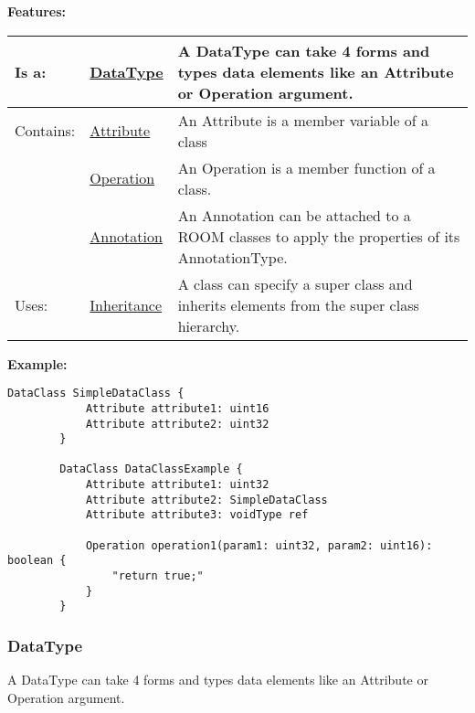 		
	\begingroup
	\textbf{Features:}
	\renewcommand{\arraystretch}{1.8} %
	\begin{longtable}{l|l p{}}
		\hline
	Is a: & \tabitem \hyperlink{ref:DataType}{DataType}  & A DataType can take 4 forms and types data elements like an Attribute or Operation argument.\\
	\hline
	Contains: & \tabitem \hyperlink{ref:Attribute}{Attribute}  & An Attribute is a member variable of a class\\
	& \tabitem \hyperlink{ref:Operation}{Operation}  & An Operation is a member function of a class. \\
	& \tabitem \hyperlink{ref:Annotation}{Annotation}  & An Annotation can be attached to a ROOM classes to apply the properties of its AnnotationType. \\
	\hline
	Uses: & \tabitem \hyperlink{ref:Inheritance}{Inheritance}  & A class can specify a super class and inherits elements from the super class hierarchy.\\
	\hline
	\end{longtable}
	\endgroup
		
		
	\textbf{Example:}
	
		\begin{lstlisting}[language=ROOM]
		DataClass SimpleDataClass {
			Attribute attribute1: uint16
			Attribute attribute2: uint32
		}
		
		DataClass DataClassExample {
			Attribute attribute1: uint32
			Attribute attribute2: SimpleDataClass
			Attribute attribute3: voidType ref
			
			Operation operation1(param1: uint32, param2: uint16): boolean {
				"return true;"
			}
		}
		\end{lstlisting}
	
	\vspace{\baselineskip}
	\vspace{\baselineskip}
	\vspace{\baselineskip}
	
\subsubsection{DataType}
	\hypertarget{ref:DataType}{}
	A DataType can take 4 forms and types data elements like an Attribute or Operation argument.
		
		
		
